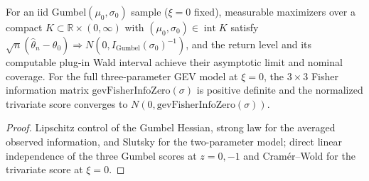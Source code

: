 \begin{theorem}[Two-parameter Gumbel MLE normality and $3 \times 3$ Fisher information at \texorpdfstring{$\xi = 0$}{xi = 0}]
  \label{thm:gumbel-mle-normality}
  \leanok
  For an iid Gumbel$(\mu_0, \sigma_0)$ sample ($\xi = 0$ fixed), measurable maximizers over a compact
  $K \subset \mathbb{R} \times (0, \infty)$ with $(\mu_0, \sigma_0) \in \operatorname{int} K$ satisfy
  $\sqrt{n}(\hat\theta_n - \theta_0) \Rightarrow N(0, I_{\mathrm{Gumbel}}(\sigma_0)^{-1})$, and the
  return level and its computable plug-in Wald interval achieve their asymptotic limit and nominal coverage.
  For the full three-parameter GEV model at $\xi = 0$, the $3 \times 3$ Fisher information matrix
  $\mathrm{gevFisherInfoZero}(\sigma)$ is positive definite and the normalized trivariate score converges
  to $N(0, \mathrm{gevFisherInfoZero}(\sigma))$.
\end{theorem}
\begin{proof}
  \leanok
  Lipschitz control of the Gumbel Hessian, strong law for the averaged observed information, and Slutsky
  for the two-parameter model; direct linear independence of the three Gumbel scores at $z = 0, -1$
  and Cram\'er--Wold for the trivariate score at $\xi = 0$.
\end{proof}
